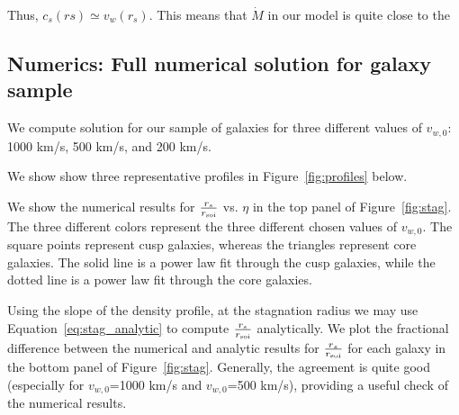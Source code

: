\documentclass[usenatbib,fleqn]{mn2e}
\newcommand{\rs}{r_s}
\newcommand{\vw}{v_w}
\newcommand{\cs}{c_s}
\newcommand{\cs}{\frac{p}{\rho}}
\newcommand{\soi}{\rm soi}
\newcommand{\rsoi}{r_{\soi}}
\newcommand{\vwO}{v_{w,0}}
\newcommand{\x}{\frac{r_s}{\rsoi}}
\begin{document}
Thus, $\cs(rs)\simeq \vw(\rs)$. This means that $\dot{M}$ in our model is quite close to the 



\subsection{Numerics: Full numerical solution for galaxy sample}
We compute solution for our sample of galaxies for three different values of $v_{w,0}$: 1000 km/s, 500 km/s, and 200 km/s. 

We show show three representative profiles in Figure~\ref{fig:profiles} below. 

We show the numerical results for $\x$ vs. $\eta$ in the top panel of Figure~\ref{fig:stag}.  The three different colors represent the three different chosen values of $\vwO$. The square points represent cusp galaxies, whereas the triangles represent core galaxies.  The solid line is a power law fit through the cusp galaxies, while the dotted line is a power law fit through the core galaxies. 

Using the slope of the density profile, at the stagnation radius we may use Equation~\ref{eq:stag_analytic} to compute $\x$ analytically. We plot the fractional difference between the numerical and analytic results for $\x$ for each galaxy in the bottom panel of Figure~\ref{fig:stag}.  Generally, the agreement is quite good (especially for $\vwO$=1000 km/s and $\vwO$=500 km/s), providing a useful check of the numerical results. 

\end{document}
